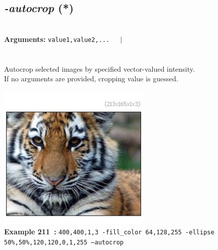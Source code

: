 \documentclass[a4paper,11pt,twoside]{book}
\begin{document}
\subsection{\emph{-autocrop} (*)}\vspace*{-0.5em}
~\\\textbf{Arguments: } 
{\small \texttt{value1,value2,...}}~~~$|$\\
\\~\\
Autocrop selected images by specified vector-valued intensity.
~\\If no arguments are provided, cropping value is guessed.
\begin{center}\includegraphics[keepaspectratio=true,height=7cm,width=\textwidth]{img/gmic_def211.jpg}\\
{\footnotesize \textbf{Example 211~:} \texttt{400,400,1,3 -fill\_color 64,128,255 -ellipse 50\%,50\%,120,120,0,1,255 --autocrop}}
\end{center}
\end{document}
